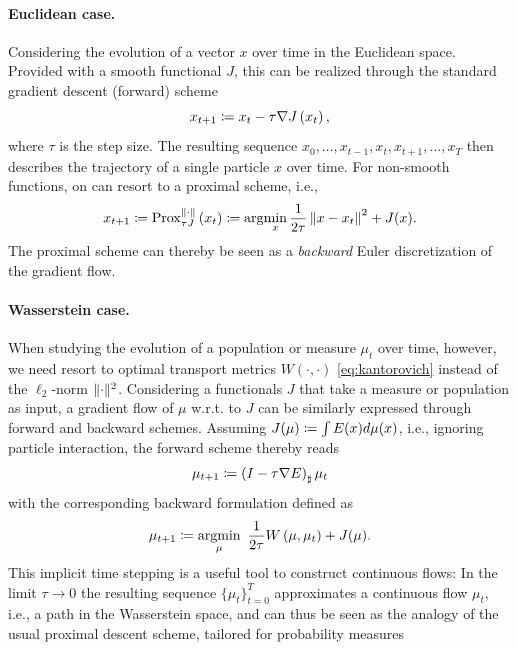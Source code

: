 
\paragraph{Euclidean case.}
Considering the evolution of a vector $x$ over time in the Euclidean space. Provided with a smooth functional $J$, this can be realized through the standard gradient descent (forward) scheme
\begin{equation*}
	x_{t+1} \coloneqq x_{t}-\tau \nabla J\left(x_{t}\right),
\end{equation*}
where $\tau$ is the step size. The resulting sequence ${x_0, \dots, x_{t-1}, x_{t}, x_{t+1}, \dots, x_T}$ then describes the trajectory of a single particle $x$ over time.
For non-smooth functions, on can resort to a proximal scheme, i.e.,
\begin{equation*}
	x_{t+1} \coloneqq \operatorname{Prox}_{\tau J}^{\|\cdot\|}\left(x_{t}\right) \coloneqq \arg\!\min_x \frac{1}{2\tau}\left\| x-x_t\right\|^2+ J(x).
\end{equation*}
The proximal scheme can thereby be seen as a \emph{backward} Euler discretization of the gradient flow.

\paragraph{Wasserstein case.}
When studying the evolution of a population or measure $\mu_t$ over time, however, we need resort to optimal transport metrics $W(\cdot, \cdot)$ \eqref{eq:kantorovich} instead of the $\ell_2$-norm $\lVert\cdot\rVert^2$.
Considering a functionals $J$ that take a measure or population as input, a gradient flow of $\mu$ w.r.t. to $J$ can be similarly expressed through forward and backward schemes. Assuming $J(\mu) 
\coloneqq \int E(x) d \mu(x)$, i.e., ignoring particle interaction, the forward scheme thereby reads
\begin{equation*}
	\mu_{t+1}\coloneqq\left(I-\tau \nabla E\right)_{\sharp} \mu_t
\end{equation*}
with the corresponding backward formulation defined as
\begin{equation}
	\label{eq:jko}
	\mu_{t+1}\coloneqq\underset{\mu}{\operatorname{argmin}} \enspace \frac{1}{2\tau}W\left(\mu, \mu_t\right)+ J(\mu).
\end{equation}
This implicit time stepping is a useful tool to construct continuous flows: In the limit $\tau \rightarrow 0$ the resulting sequence $\{\mu_t\}_{t=0}^T$ approximates a continuous flow $\mu_t$, i.e., a path in the Wasserstein space, and can thus be seen as the analogy of the usual proximal descent scheme, tailored for probability measures~\citep[p.285]{santambrogio2015optimal}

